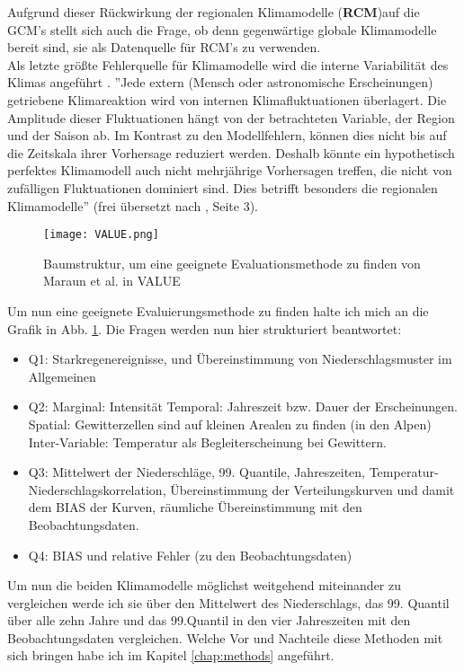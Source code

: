 Aufgrund dieser Rückwirkung der regionalen Klimamodelle (\textbf{RCM})auf die GCM's stellt sich auch die Frage, ob denn gegenwärtige globale Klimamodelle bereit sind, sie als Datenquelle für RCM's zu verwenden.\\
Als letzte größte Fehlerquelle für Klimamodelle wird die interne Variabilität des Klimas angeführt \cite[vgl.][]{maraun_2013}. ''Jede extern (Mensch oder astronomische Erscheinungen) getriebene Klimareaktion wird von internen Klimafluktuationen überlagert. Die Amplitude dieser Fluktuationen hängt von der betrachteten Variable, der Region und der Saison ab. Im Kontrast zu den Modellfehlern, können dies nicht bis auf die Zeitskala ihrer Vorhersage reduziert werden. Deshalb könnte ein hypothetisch perfektes Klimamodell auch nicht mehrjährige Vorhersagen treffen, die nicht von zufälligen Fluktuationen dominiert sind. Dies betrifft besonders die regionalen Klimamodelle'' (frei übersetzt nach \cite{maraun_value}, Seite 3).\newline
\begin{figure}[h]
	\centering
	\texttt{[image: VALUE.png]}
	\caption{Baumstruktur, um eine geeignete Evaluationsmethode zu finden von Maraun et al. in VALUE \cite{maraun_value}}
	\label{fig:value}
\end{figure}

Um nun eine geeignete Evaluierungsmethode zu finden halte ich mich an die Grafik in Abb. \ref{fig:value}. Die Fragen werden nun hier strukturiert beantwortet:
\begin{itemize}
	\item Q1: Starkregenereignisse, und Übereinstimmung von Niederschlagsmuster im Allgemeinen
	\item Q2:
		\subitem{*} Marginal: Intensität
		\subitem{*} Temporal: Jahreszeit bzw. Dauer der Erscheinungen.
		\subitem{*} Spatial: Gewitterzellen sind auf kleinen Arealen zu finden (in den Alpen)
		\subitem{*} Inter-Variable: Temperatur als Begleiterscheinung bei Gewittern.
	\item Q3: Mittelwert der Niederschläge, 99. Quantile, Jahreszeiten, Temperatur-Niederschlagskorrelation, Übereinstimmung der Verteilungskurven und damit dem BIAS der Kurven, räumliche Übereinstimmung mit den Beobachtungsdaten.
	\item Q4: BIAS und relative Fehler (zu den Beobachtungsdaten)
\end{itemize}

Um nun die beiden Klimamodelle möglichst weitgehend miteinander zu vergleichen werde ich sie über den Mittelwert des Niederschlags, das 99. Quantil über alle zehn Jahre und das 99.Quantil in den vier Jahreszeiten mit den Beobachtungsdaten vergleichen. Welche Vor und Nachteile diese Methoden mit sich bringen habe ich im Kapitel \ref{chap:methods} angeführt.\\



